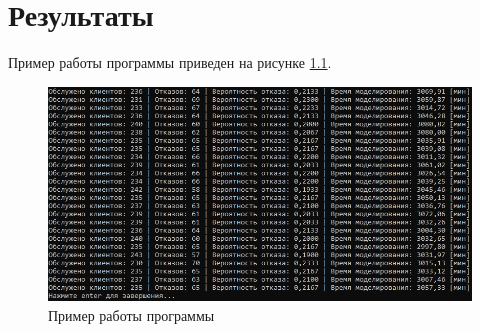 \chapter{Результаты}
Пример работы программы приведен на рисунке \ref{p1}.

\begin{figure}[h]
	\includegraphics[width=1\linewidth]{inc/img/res1.png}
	\caption{Пример работы программы}
	\label{p1}
\end{figure}
